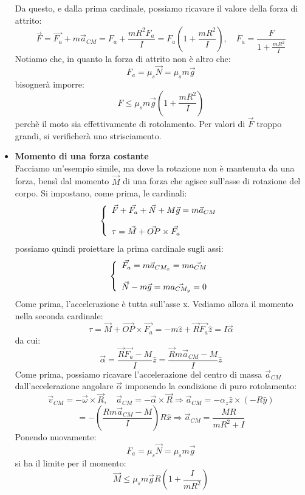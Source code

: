 \documentclass[a4paper,12pt]{article}
\begin{document}
\begin{itemize}
    Da questo, e dalla prima cardinale, possiamo ricavare il valore della forza di attrito:
    $$ \vec{F} = \vec{F_a}+ m\vec{a}_{CM} = F_a + \frac{mR^2F_a}{I} = F_a\left( 1 + \frac{mR^2}{I} \right), \quad F_a = \frac{F}{1 + \frac{mR^2}{I}}$$
    Notiamo che, in quanto la forza di attrito non è altro che:
    $$ F_a = \mu_s \vec{N} = \mu_s m\vec{g}$$
    bisognerà imporre:
    $$ F \leq \mu_s m\vec{g}\left(1 + \frac{mR^2}{I} \right)$$
    perchè il moto sia effettivamente di rotolamento. Per valori di $\vec{F}$ troppo grandi, si verificherà uno strisciamento.
  \item \textbf{Momento di una forza costante} \\
    Facciamo un'esempio simile, ma dove la rotazione non è mantenuta da una forza, bensì dal momento $\vec{M}$ di una forza che agisce sull'asse di rotazione del corpo. Si impostano, come prima, le cardinali:
    $$ 
    \left\{\begin{array}{l}
        \vec{F} + \vec{F_a} + \vec{N} + M \vec{g} = m\vec{a}_{CM} \cr \\
        \tau = \vec{M} + \vec{OP} \times \vec{F_a}
    \end{array}\right.
    $$
    possiamo quindi proiettare la prima cardinale sugli assi:
    $$ 
    \left\{\begin{array}{l}
        \vec{F_a} = m\vec{a}_{CM_x} = m\vec{a_{CM}}  \cr \\ 
        \vec{N} - m\vec{g} = m\vec{a_{CM_y}} = 0
    \end{array}\right.
    $$
    Come prima, l'accelerazione è tutta sull'asse x. Vediamo allora il momento nella seconda cardinale:
    $$ \tau = \vec{M} + \vec{OP} \times \vec{F_a} = -m\hat{z} + \vec{R}\vec{F_a}\hat{z} = I\vec{\alpha} $$
    da cui:
    $$ \vec{\alpha} = \frac{\vec{R}\vec{F_a} - M}{I}\hat{z} = \frac{\vec{R}m\vec{a}_{CM} - M}{I}\hat{z} $$
    Come prima, possiamo ricavare l'accelerazione del centro di massa $\vec{a}_{CM}$ dall'accelerazione angolare $\vec{\alpha}$ imponendo la condizione di puro rotolamento:
    $$ \vec{v}_{CM} = -\vec{\omega} \times \vec{R}, \quad \vec{a}_{CM} = -\vec{\alpha} \times \vec{R} \Rightarrow \vec{a}_{CM} = -\alpha_z\hat{z} \times (-R\hat{y})$$
    $$ = -\left( \frac{Rm\vec{a}_{CM} - M}{I}  \right)R\hat{x} \Rightarrow \vec{a}_{CM} = \frac{MR}{mR^2 + I}  $$
    Ponendo nuovamente:
    $$ F_a = \mu_s \vec{N} = \mu_s m\vec{g}$$
    si ha il limite per il momento:
    $$ \vec{M} \leq \mu_s m\vec{g}R \left( 1 + \frac{I}{mR^2} \right) $$
\end{itemize}
\end{document}
